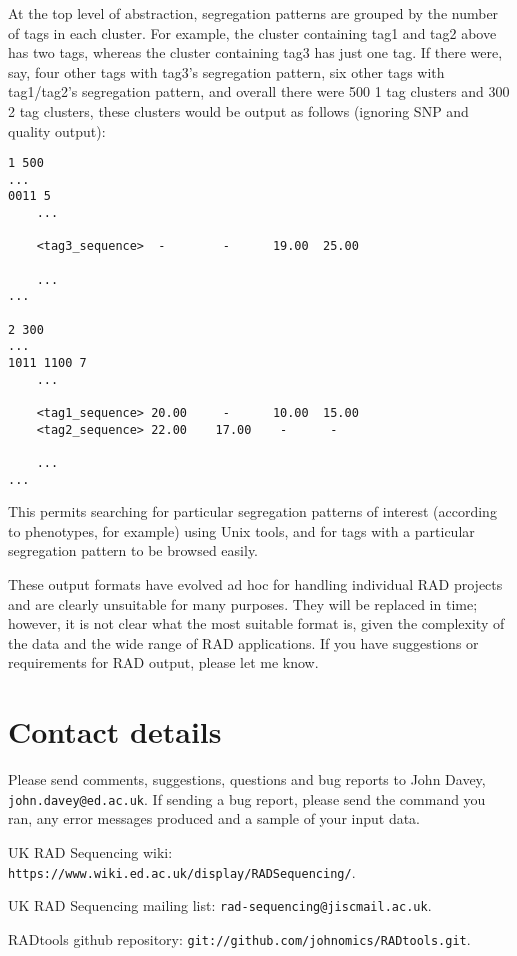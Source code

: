 \documentclass[a4paper]{article}
\begin{document}
At the top level of abstraction, segregation patterns are grouped by the number of tags in each cluster. For example, the cluster containing tag1 and tag2 above has two tags, whereas the cluster containing tag3 has just one tag. If there were, say, four other tags with tag3's segregation pattern, six other tags with tag1/tag2's segregation pattern, and overall there were 500 1 tag clusters and 300 2 tag clusters, these clusters would be output as follows (ignoring SNP and quality output):

\begin{verbatim}
1 500
...
0011 5
    ...

    <tag3_sequence>  -        -      19.00  25.00

    ...
...

2 300
...
1011 1100 7
    ...

    <tag1_sequence> 20.00     -      10.00  15.00
    <tag2_sequence> 22.00    17.00    -      -

    ...
...
\end{verbatim}

This permits searching for particular segregation patterns of interest (according to phenotypes, for example) using Unix tools, and for tags with a particular segregation pattern to be browsed easily.

These output formats have evolved ad hoc for handling individual RAD projects and are clearly unsuitable for many purposes. They will be replaced in time; however, it is not clear what the most suitable format is, given the complexity of the data and the wide range of RAD applications. If you have suggestions or requirements for RAD output, please let me know.


\section{Contact details}

Please send comments, suggestions, questions and bug reports to John Davey, \verb|john.davey@ed.ac.uk|. If sending a bug report, please send the command you ran, any error messages produced and a sample of your input data.

UK RAD Sequencing wiki: \verb|https://www.wiki.ed.ac.uk/display/RADSequencing/|.

UK RAD Sequencing mailing list: \verb|rad-sequencing@jiscmail.ac.uk|.

RADtools github repository: \verb|git://github.com/johnomics/RADtools.git|.
\end{document}
